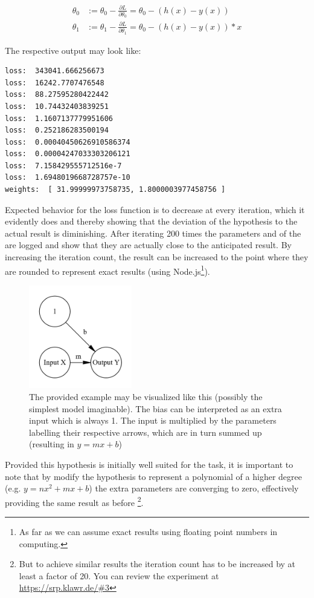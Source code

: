 \begin{equation}
    \begin{split}
        \theta_{0} & := \theta_{0} - \frac{\partial L}{\partial \theta_{0}} =
        \theta_{0} - (h(x) - y(x))  \\
        \theta_{1} & := \theta_{1} - \frac{\partial L}{\partial \theta_{1}} =
        \theta_{0} - (h(x) - y(x)) * x
    \end{split}
    \label{eq:sgd_mse_here}
\end{equation}

The respective output may look like:
\begin{lstlisting}
loss:  343041.666256673
loss:  16242.7707476548
loss:  88.27595280422442
loss:  10.74432403839251
loss:  1.1607137779951606
loss:  0.252186283500194
loss:  0.00040450626910586374
loss:  0.00004247033303206121
loss:  7.158429555712516e-7
loss:  1.6948019668728757e-10
weights:  [ 31.99999973758735, 1.8000003977458756 ]
\end{lstlisting} 

Expected behavior for the loss function is to decrease at every iteration, which it evidently does and thereby showing that the deviation of the hypothesis to the actual result is diminishing.
After iterating 200 times the parameters  and  of the  are logged and show that they are actually close to the anticipated result.
By increasing the iteration count, the result can be increased to the point where they are rounded to represent exact results (using Node.js\footnote{ As far as we can assume exact results using floating point numbers in computing.}).

\begin{figure}
    \centering
    \caption{ The provided example may be visualized like this (possibly the        simplest model imaginable).
        The bias can be interpreted as an extra input which is always 1.
        The input is multiplied by the parameters labelling their respective arrows, which are in turn summed up (resulting in $y = mx + b$) }
    \includegraphics[width=0.4\textwidth]{images/1_simplest_nn.png}
\end{figure} 

Provided this hypothesis is initially well suited for the task, it is important to note that by modify the hypothesis to represent a polynomial of a higher degree (e.g. $y = nx^2 + mx + b$) the extra parameters are converging to zero, effectively providing the same result as before
\footnote{But to achieve similar results the iteration count has to be increased by at least a factor of 20.
You can review the experiment at \url{https://srp.klawr.de/\#3}}.
